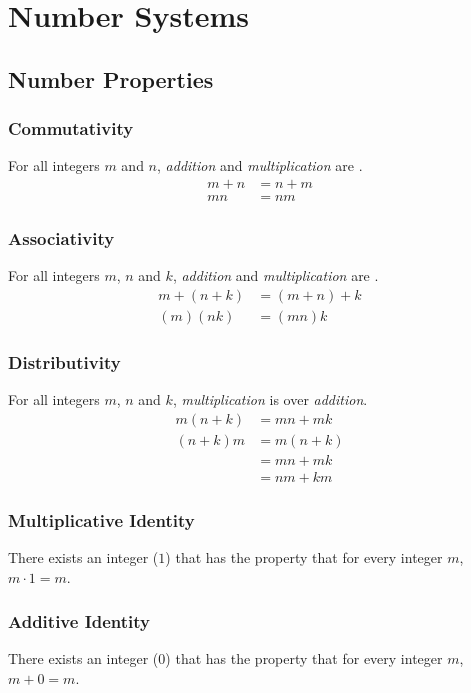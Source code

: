 \documentclass[\main/notes.tex]{subfiles}
\begin{document}
	\chapter{Number Systems}
		\section{Number Properties}
			\subsection{Commutativity}
				For all integers $m$ and $n$, \emph{addition} and \emph{multiplication} are .
				\nopagebreak
				\begin{align*}
					m + n &= n + m \tag*{addition}\\
					mn &= nm \tag*{multiplication}
				\end{align*}
			\subsection{Associativity}
				For all integers $m$, $n$ and $k$, \emph{addition} and \emph{multiplication} are .
				\nopagebreak
				\begin{align*}
					m+(n+k) &= (m+n)+k \tag*{addition}\\
					(m)(nk) &= (mn)k \tag*{multiplication}
				\end{align*}
			\subsection{Distributivity}
				For all integers $m$, $n$ and $k$, \emph{multiplication} is  over \emph{addition}.
				\nopagebreak
				\begin{align*}
					m(n + k) &= mn + mk\\
					(n + k)m &= m(n + k)\\
					&= mn + mk\\
					&= nm + km
				\end{align*}
			\subsection{Multiplicative Identity}
				There exists an integer ($1$) that has the property that for every integer $m$, $m\cdot 1 = m$.
			\subsection{Additive Identity}
				There exists an integer ($0$) that has the property that for every integer $m$, $m + 0 = m$.
\end{document}
